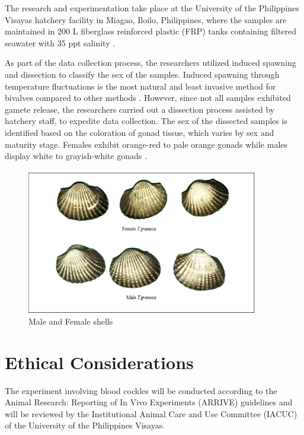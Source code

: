 The research and experimentation take place at the University of the Philippines Visayas hatchery facility in Miagao, Iloilo, Philippines, where the samples are maintained in 200 L fiberglass reinforced plastic (FRP) tanks containing filtered seawater with 35 ppt salinity \cite{miranda2023}. 

As part of the data collection process, the researchers utilized induced spawning and dissection to classify the sex of the samples. Induced spawning through temperature fluctuations is the most natural and least invasive method for bivalves compared to other methods \cite{aji}. However, since not all samples exhibited gamete release, the researchers carried out a dissection process assisted by hatchery staff, to expedite data collection. The sex of the dissected samples is identified based on the coloration of gonad tissue, which varies by sex and maturity stage. Females exhibit orange-red to pale orange gonads while males display white to grayish-white gonads \cite{may2021}. 

\begin{figure}[!htbp]
	\centering
	\includegraphics[width=0.9\textwidth]{figures/male-female T.granosa.png}
	\caption{Male and Female \Tegillarcagranosa shells}
\end{figure}

\section{Ethical Considerations}
\label{sec:ethical}

The experiment involving blood cockles will be conducted according to the Animal Research: Reporting of In Vivo Experiments (ARRIVE) guidelines and will be reviewed by the Institutional Animal Care and Use Committee (IACUC) of the University of the Philippines Visayas. 

